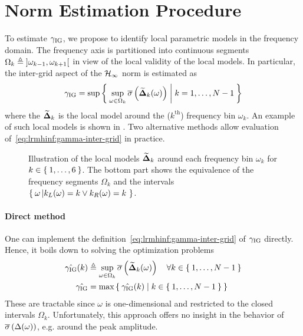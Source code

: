 \section{\Hinf{} Norm Estimation Procedure}
\label{sec:lrmhinf:LPMHinf}
To estimate $\gamma_{\mathrm{IG}}$, we propose to identify local parametric models in the frequency domain.
The frequency axis is partitioned into continuous segments $\Omega_k \triangleq \left]  \omega_{k-1} , \omega_{k+1}  \right[$ in view of the local validity of the local models.
In particular, the inter-grid aspect of the $\mathcal{H}_{\infty}$ norm is estimated as
\begin{equation}
  \gamma_{\mathrm{IG}} = 
    \sup \Set{ 
                \sup_{\omega \in \Omega_k} \ensuremath{ \overline{\sigma} \left( \widetilde{\mathbf{\Delta}}_k(\omega) \right) }
                |
                k = 1,\ldots,N-1
                }
   \label{eq:lrmhinf:gamma-inter-grid}
\end{equation}
where the $\widetilde{\mathbf{\Delta}}_{k}$ is the local model around the ($k^{\text{th}}$) frequency bin $\omega_k$.
An example of such local models is shown in .
Two alternative methods allow evaluation of~\eqref{eq:lrmhinf:gamma-inter-grid} in practice.

\begin{figure}
  \centering
  \setlength{\figurewidth}{0.68\columnwidth}
  \setlength{\figureheight}{0.68\figurewidth}
  
  \caption[Illustration of the local models.]{Illustration of the local models $\widetilde{\mathbf{\Delta}}_k$ around each frequency bin $\omega_k$ for $k\in\Set{1,\ldots,6}$.
  The bottom part shows the equivalence of the frequency segments $\Omega_k$ and the intervals $\Set{\omega \left| k_L(\omega) = k \vee k_R(\omega) = k \right.}$.}
\label{fig:lrmhinf:interpol-quantities}
\end{figure}

\paragraph*{Direct method}
One can implement the definition~\eqref{eq:lrmhinf:gamma-inter-grid} of $\gamma_{\mathrm{IG}}$ directly.
Hence, it boils down to solving the optimization problems
\begin{align}
  \hat{\gamma_{\mathrm{IG}}}(k) & \triangleq 
      \sup_{\omega \in \Omega_k}
       \overline{\sigma} \left( \widetilde{\mathbf{\Delta}}_k(\omega) \right) 
       \quad \forall k \in \Set{1,\ldots,N-1} 
       \label{eq:lrmhinf:gamma-direct:optimizations}\\
  \hat{\gamma_{\mathrm{IG}}} &= 
  \max \Set{
    \ensuremath{\hat{\gamma_{\mathrm{IG}}}}(k) 
    | 
    k \in \Set{1,\ldots,N-1}
  }
      \label{eq:lrmhinf:gamma-direct}
\end{align}
These are tractable since $\omega$ is one-dimensional and restricted to the closed intervals $\Omega_k$.
Unfortunately, this approach offers no insight in the behavior of $ \overline{\sigma} \left( \Delta(\omega) \right) $, e.g. around the peak amplitude.


